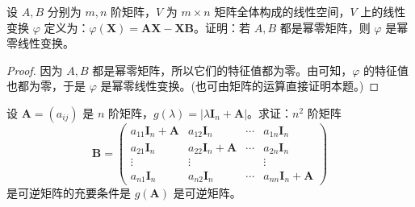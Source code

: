\documentclass[../../main.tex]{subfiles}%
\begin{document}
\begin{example}
设 $A,B$ 分别为 $m,n$ 阶矩阵，$V$ 为 $m \times n$ 矩阵全体构成的线性空间，$V$ 上的线性变换 $\varphi$ 定义为：$\varphi(\boldsymbol{X}) = \boldsymbol{AX} - \boldsymbol{XB}$。证明：若 $A,B$ 都是幂零矩阵，则 $\varphi$ 是幂零线性变换。
\end{example}
\begin{proof}

因为 $A,B$ 都是幂零矩阵，所以它们的特征值都为零。由可知，$\varphi$ 的特征值也都为零，于是 $\varphi$ 是幂零线性变换。(也可由矩阵的运算直接证明本题。)

\end{proof}

\begin{example}
设 $\boldsymbol{A} = (a_{ij})$ 是 $n$ 阶矩阵，$g(\lambda) = |\lambda\boldsymbol{I}_n + \boldsymbol{A}|$。求证：$n^2$ 阶矩阵
\[
\boldsymbol{B} = 
\begin{pmatrix}
a_{11}\boldsymbol{I}_n + \boldsymbol{A} & a_{12}\boldsymbol{I}_n & \cdots & a_{1n}\boldsymbol{I}_n \\
a_{21}\boldsymbol{I}_n & a_{22}\boldsymbol{I}_n + \boldsymbol{A} & \cdots & a_{2n}\boldsymbol{I}_n \\
\vdots & \vdots & & \vdots \\
a_{n1}\boldsymbol{I}_n & a_{n2}\boldsymbol{I}_n & \cdots & a_{nn}\boldsymbol{I}_n + \boldsymbol{A}
\end{pmatrix}
\]
是可逆矩阵的充要条件是 $g(\boldsymbol{A})$ 是可逆矩阵。
\end{example}
\end{document}
